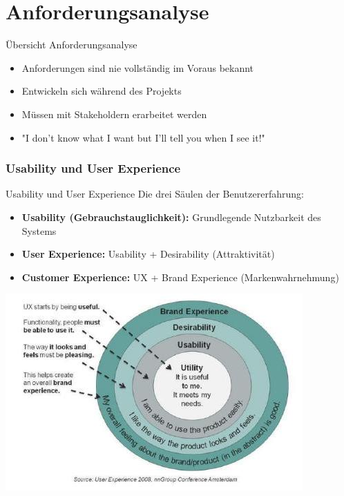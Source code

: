 \section{Anforderungsanalyse}

\begin{concept}{Übersicht Anforderungsanalyse}
\begin{itemize}
    \item Anforderungen sind nie vollständig im Voraus bekannt
    \item Entwickeln sich während des Projekts
    \item Müssen mit Stakeholdern erarbeitet werden
    \item "I don't know what I want but I'll tell you when I see it!"
\end{itemize}
\end{concept}

\subsubsection{Usability und User Experience}

\begin{concept}{Usability und User Experience}
Die drei Säulen der Benutzererfahrung:
\begin{itemize}
    \item \textbf{Usability (Gebrauchstauglichkeit):} Grundlegende Nutzbarkeit des Systems
    \item \textbf{User Experience:} Usability + Desirability (Attraktivität)
    \item \textbf{Customer Experience:} UX + Brand Experience (Markenwahrnehmung)
\end{itemize}
\includegraphics[width=0.9\linewidth]{images/2024_12_29_0d1d7b5551ea1b4b41bdg-02}
\end{concept}

